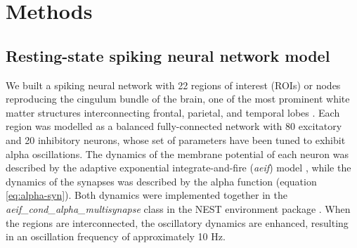 \documentclass[../main.tex]{subfiles}
\begin{document}
\section{Methods}
\subsection{Resting-state spiking neural network model}
We built a spiking neural network with 22 regions of interest (ROIs) or nodes reproducing the cingulum bundle of the brain, one of the most prominent white matter structures interconnecting frontal, parietal, and temporal lobes \citep{bubb_cingulum_2018}.
Each region was modelled as a balanced fully-connected network with 80 excitatory and 20 inhibitory neurons, whose set of parameters have been tuned to exhibit alpha oscillations.
The dynamics of the membrane potential of each neuron was described by the adaptive exponential integrate-and-fire (\textit{aeif}) model \citep{naud_firing_2008}, while the dynamics of the synapses was described by the alpha function (equation \eqref{eq:alpha-syn}).
Both dynamics were implemented together in the \textit{aeif\_cond\_alpha\_multisynapse} class in the NEST environment package \citep{eppler2009pynest,gewaltig2007nest}.
When the regions are interconnected, the oscillatory dynamics are enhanced, resulting in an oscillation frequency of approximately 10 Hz.
\end{document}
